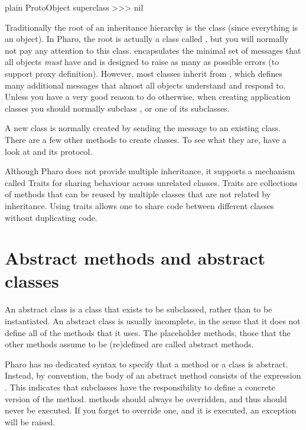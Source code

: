 \documentclass[10pt,twoside,english]{_support/latex/sbabook/sbabook}
\begin{document}
\begin{displaycode}{plain}
ProtoObject superclass
>>> nil
\end{displaycode}

Traditionally the root of an inheritance hierarchy is the class 
(since everything is an object). In Pharo, the root is actually a class called
, but you will normally not pay any attention to this class.
 encapsulates the minimal set of messages that all objects
\textit{must} have and  is designed to raise as many as possible
errors (to support proxy definition). However, most classes inherit from
, which defines many additional messages that almost all objects
understand and respond to. Unless you have a very good reason to do otherwise,
when creating application classes you should normally subclass , or
one of its subclasses.

A new class is normally created by sending the message  to an existing class. There are a few other methods
to create classes. To see what they are, have a look at  and its
 protocol.

Although Pharo does not provide multiple inheritance, it supports a mechanism
called Traits for sharing behaviour across unrelated classes. Traits are
collections of methods that can be reused by multiple classes that are not
related by inheritance. Using traits allows one to share code between different
classes without duplicating code.
\section{Abstract methods and abstract classes}
An abstract class is a class that exists to be subclassed, rather than to be
instantiated. An abstract class is usually incomplete, in the sense that it does
not define all of the methods that it uses. The placeholder methods, those
that the other methods assume to be (re)defined are called abstract methods.

Pharo has no dedicated syntax to specify that a method or a class is abstract.
Instead, by convention, the body of an abstract method consists of the
expression . This indicates that subclasses have
the responsibility to define a concrete version of the method.  methods should always be overridden, and thus should
never be executed. If you forget to override one, and it is executed, an
exception will be raised.
\end{document}
